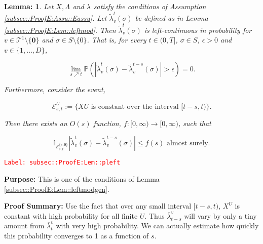 \documentclass[12pt]{article}
\newcommand{\mb}{\mathbb}
\newcommand{\mc}{\mathcal}
\newcommand{\ra}{\rightarrow}
\newcommand{\ov}{\overline}
\newcommand{\te}{\text}
\newcommand{\ep}{\epsilon}
\newcommand{\tr}{\textcolor{red}}
\newcommand{\labe}[1]{\tr{\texttt{Label: #1}}}
\newcommand{\purpose}{\textbf{Purpose: }}
\newcommand{\pfsum}{\textbf{Proof Summary: }}
\newcommand{\pr}{\mb{P}}							%
\renewcommand{\root}{\mathbf{0}}				%
\renewcommand{\v}{v}							%
\renewcommand{\U}{U}							%
\renewcommand{\S}{S}							%
\newcommand{\s}{\sigma}							%
\newcommand{\T}{T}								%
\renewcommand{\t}{t}							%
\renewcommand{\tt}{s}							%
\newcommand{\X}{X}								%
\newcommand{\degr}{D}								%
\newcommand{\pup}[1]{^{#1}}							%
\newcommand{\tree}{\mc{T}}							%
\newcommand{\rate}[1]{\lambda_{#1}}					%
\newcommand{\ratee}[1]{\Lambda_{#1}}				%
\newcommand{\crate}[2]{\alt{\lambda}_{#1}^{#2}}		%
\newcommand{\alt}{\widetilde}						%
\newcommand{\evnt}{\mc{E}}						%
\newtheorem{lem}[thms]{Lemma: }
\begin{document}
\begin{lem}
Let \(\X{}{},\ratee{}{}\) and \(\rate{}\) satisfy the conditions of Assumption \ref{subsec::ProofE:Assu::Eassu}. Let \(\crate{\v}{\t}(\s)\) be defined as in Lemma \ref{subsec::ProofE:Lem::leftmod}. Then \(\crate{\v}{\t}(\s)\) is left-continuous in probability for \(\v \in \tree\pup{1}\setminus\{\root\}\) and \(\s \in \S\setminus\{0\}\). That is, for every \(\t \in (0,\T]\), \(\s \in \S\), \(\ep > 0\) and \(\v\in \{1,\dots,\degr\}\),

\[\lim_{\tt \nearrow \t}\pr\left(|\crate{\v}{\t}(\s)- \crate{\v}{\t-\tt}(\s)| > \ep\right) = 0.\]

Furthermore, consider the event,

\[\evnt^\U_{\tt,\t} := \{\X{\U}{} \te{ is constant over the interval } [\t-\tt,\t)\}.\]

Then there exists an \(O(s)\) function, \(f:[0,\infty)\ra[0,\infty)\), such that 

\[\mb{I}_{\evnt^{\{\v,\root\}}_{\tt,\t}}|\crate{\v}{\t}(\s) - \crate{\v}{\t-\tt}(\s)| \leq f(s) \te{ almost surely.}\]
\label{subsec::ProofE:Lem::pleft}
\end{lem}
\labe{subsec::ProofE:Lem::pleft}

\purpose This is one of the conditions of Lemma \ref{subsec::ProofE:Lem::leftmodgen}.

\pfsum Use the fact that over any small interval \([t-s,t)\), \(X^U\) is constant with high probability for all finite \(U\). Thus \(\ov{\lambda}^v_{t-s}\) will vary by only a tiny amount from \(\ov{\lambda}^v_t\) with very high probability. We can actually estimate how quickly this probability converges to 1 as a function of \(s\).
\end{document}

